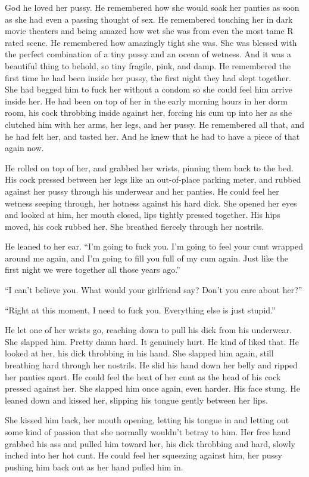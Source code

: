 \documentclass[letterpaper]{article}
\begin{document}
God he loved her pussy. He remembered how she would soak her panties as soon as she had even a passing thought of sex. 
He remembered touching her in dark movie theaters and being amazed how wet she was from even the most tame R rated scene.
He remembered how amazingly tight she was. She was blessed with the perfect combination of a tiny pussy and an ocean of wetness. And it was a beautiful thing to behold, so tiny fragile, pink, and damp.
He remembered the first time he had been inside her pussy, the first night they had slept together. She had begged him to fuck her without a condom so she could feel him arrive inside her.
He had been on top of her in the early morning hours in her dorm room, his cock throbbing inside against her, forcing his cum up into her as she clutched him with her arms, her legs, and her pussy.
He remembered all that, and he had felt her, and tasted her. And he knew that he had to have a piece of that again now.

He rolled on top of her, and grabbed her wrists, pinning them back to the bed. His cock pressed between her legs like an out-of-place parking meter, and rubbed against her pussy through his underwear and her panties.
He could feel her wetness seeping through, her hotness against his hard dick.
She opened her eyes and looked at him, her mouth closed, lips tightly pressed together.
His hips moved, his cock rubbed her. She breathed fiercely through her nostrils.

He leaned to her ear.
``I'm going to fuck you. I'm going to feel your cunt wrapped around me again, and I'm going to fill you full of my cum again. Just like the first night we were together all those years ago.''

``I can't believe you. What would your girlfriend say? Don't you care about her?''

``Right at this moment, I need to fuck you. Everything else is just stupid.''

He let one of her wrists go, reaching down to pull his dick from his underwear.
She slapped him. Pretty damn hard. It genuinely hurt. He kind of liked that. He looked at her, his dick throbbing in his hand.
She slapped him again, still breathing hard through her nostrils. He slid his hand down her belly and ripped her panties apart. He could feel the heat of her cunt as the head of his cock pressed against her.
She slapped him once again, even harder. His face stung. He leaned down and kissed her, slipping his tongue gently between her lips.

She kissed him back, her mouth opening, letting his tongue in and letting out some kind of passion that she normally wouldn't betray to him.
Her free hand grabbed his ass and pulled him toward her, his dick throbbing and hard, slowly inched into her hot cunt. He could feel her squeezing against him, her pussy pushing him back out as her hand pulled him in.
\end{document}
